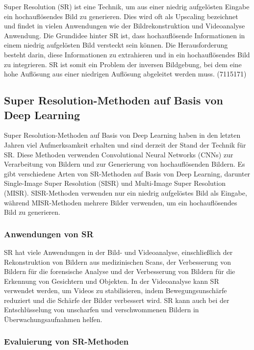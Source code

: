     Super Resolution (SR) ist eine Technik, um aus einer niedrig aufgelösten Eingabe ein hochauflösendes Bild zu generieren. 
    Dies wird oft als Upscaling bezeichnet und findet in vielen Anwendungen wie der Bildrekonstruktion und Videoanalyse Anwendung.
    Die Grundidee hinter SR ist, dass hochauflösende Informationen in einem niedrig aufgelösten Bild versteckt sein können. 
    Die Herausforderung besteht darin, diese Informationen zu extrahieren und in ein hochauflösendes Bild zu integrieren. 
    SR ist somit ein Problem der inversen Bildgebung, bei dem eine hohe Auflösung aus einer niedrigen Auflösung abgeleitet werden muss.
    \footfullcite(7115171)
    \subsection{Super Resolution-Methoden auf Basis von Deep Learning}
    
    Super Resolution-Methoden auf Basis von Deep Learning haben in den letzten Jahren viel Aufmerksamkeit erhalten und sind derzeit der Stand der Technik für SR. 
    Diese Methoden verwenden Convolutional Neural Networks (CNNs) zur Verarbeitung von Bildern und zur Generierung von hochauflösenden Bildern.
    Es gibt verschiedene Arten von SR-Methoden auf Basis von Deep Learning, darunter Single-Image Super Resolution (SISR) und Multi-Image Super Resolution (MISR). 
    SISR-Methoden verwenden nur ein niedrig aufgelöstes Bild als Eingabe, während MISR-Methoden mehrere Bilder verwenden, um ein hochauflösendes Bild zu generieren.
    
    \subsubsection{Anwendungen von SR}
    
    SR hat viele Anwendungen in der Bild- und Videoanalyse, einschließlich der Rekonstruktion von Bildern aus medizinischen Scans, der Verbesserung von Bildern für die forensische Analyse und der Verbesserung von Bildern für die Erkennung von Gesichtern und Objekten.
    In der Videoanalyse kann SR verwendet werden, um Videos zu stabilisieren, indem Bewegungsunschärfe reduziert und die Schärfe der Bilder verbessert wird. 
    SR kann auch bei der Entschlüsselung von unscharfen und verschwommenen Bildern in Überwachungsaufnahmen helfen.
    
    \subsubsection{Evaluierung von SR-Methoden}
    
